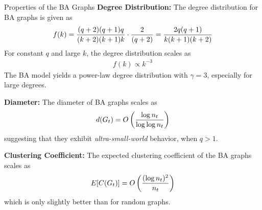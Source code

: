 \begin{frame}{Properties of the BA Graphs}
\small
\smallskip
{\bf Degree Distribution:}
The degree distribution for BA graphs is given as
\begin{align*}
f(k) = {(q+2)(q+1)q \over (k+2)(k+1)k} \cdot {2 \over
(q+2)} = {2q(q+1) \over k(k+1)(k+2)}
\end{align*}
For constant $q$ and large $k$, the degree
distribution scales as
\begin{align*}
    f(k) \propto k^{-3}
\end{align*}
The BA model yields a power-law degree
distribution with $\gamma=3$, especially for large degrees.

\medskip
{\bf Diameter:}
The diameter of BA graphs scales as
$$d(G_t) = O\left( {\log n_t \over \log \log n_t} \right)$$
suggesting that they exhibit {\em ultra-small-world} behavior,
when $q>1$.

\medskip
{\bf Clustering Coefficient:}
The expected clustering coeff\/{i}cient of the BA graphs
scales as
$$E[C(G_t)] = O\left( {(\log n_t)^2 \over n_t} \right) $$
which is only slightly better than for random graphs.
\end{frame}



